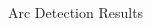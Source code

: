 \documentclass[aspectratio=169]{beamer}
\begin{document}
\begin{frame}
\begin{columns}
\begin{column}{.5\linewidth}
\begin{figure}[htbp]
{                    }
                    \quad
                    \caption{Arc Detection Results}
                \end{figure}
            \end{column}
        \end{columns}
    
    \end{frame}
\end{document}
